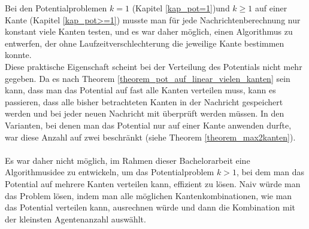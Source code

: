 Bei den Potentialproblemen $k = 1$ (Kapitel \ref{kap_pot=1})und $k \geq 1$ auf einer Kante (Kapitel \ref{kap_pot>=1}) musste man für jede Nachrichtenberechnung nur konstant viele Kanten testen, und es war daher möglich, einen Algorithmus zu entwerfen, der ohne Laufzeitverschlechterung die jeweilige Kante bestimmen konnte.
\\
Diese praktische Eigenschaft scheint bei der Verteilung des Potentials nicht mehr gegeben. Da es nach Theorem \ref{theorem_pot_auf_linear_vielen_kanten} sein kann, dass man das Potential auf fast alle Kanten verteilen muss, kann es passieren, dass alle bisher betrachteten Kanten in der Nachricht gespeichert werden und bei jeder neuen Nachricht mit überprüft werden müssen. In den Varianten, bei denen man das Potential nur auf einer Kante anwenden durfte, war diese Anzahl auf zwei beschränkt (siehe Theorem \ref{theorem_max2kanten}).
\\
\\
Es war daher nicht möglich, im Rahmen dieser Bachelorarbeit eine Algorithmusidee zu entwickeln, um das Potentialproblem $k > 1$, bei dem man das Potential auf mehrere Kanten verteilen kann, effizient zu lösen. Naiv würde man das Problem lösen, indem man alle möglichen Kantenkombinationen, wie man das Potential verteilen kann, ausrechnen würde und dann die Kombination mit der kleinsten Agentenanzahl auswählt.


